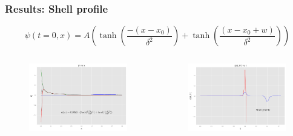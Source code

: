 \documentclass[hyperref={bookmarks=false},aspectratio=169]{beamer}
\begin{document}
\begin{frame}
    \frametitle{Results: Shell profile}

    \begin{equation*}
        \psi(t=0, x)=A\left(\tanh \left(\frac{-\left(x-x_{0}\right)}{\delta^{2}}\right)+\tanh \left(\frac{\left(x-x_{0}+w\right)}{\delta^{2}}\right)\right)
    \end{equation*}

    \begin{columns}
        \begin{figure}
            \centering
            \includegraphics[width=1\linewidth]{images/super_shell.pdf}
        \end{figure}
        \begin{figure}
            \centering
            \includegraphics[width=1\linewidth]{images/at0_shell.pdf}
        \end{figure}
    \end{columns}

\end{frame}
\end{document}
